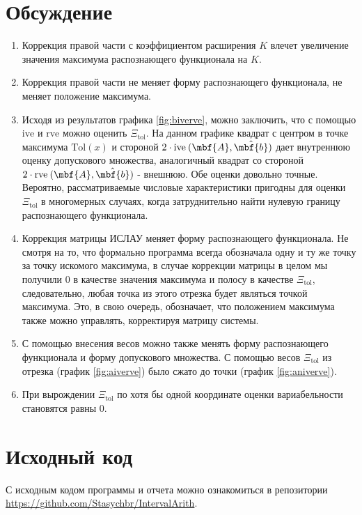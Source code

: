 \documentclass[a4paper]{article}
\begin{document}
\section{Обсуждение}
\begin{enumerate}
    \item Коррекция правой части с коэффициентом расширения $K$ влечет увеличение значения максимума распознающего функционала на $K$.
    \item Коррекция правой части не меняет форму распознающего функционала, не меняет положение максимума.
    \item Исходя из результатов графика \ref{fig:biverve}, можно заключить, что с помощью $\mathrm{ive}$ и $\mathrm{rve}$ можно оценить $\Xi_{\mathrm{tol}}$. На данном графике квадрат с центром в точке максимума $\mathrm{Tol}(x)$ и стороной $2\cdot\mathrm{ive}\:(\mbf{A}, \hat{\mbf{b}})$ дает внутреннюю оценку допускового множества, аналогичный квадрат со стороной $2\cdot\mathrm{rve}\:(\mbf{A}, \hat{\mbf{b}})$ - внешнюю. Обе оценки довольно точные. Вероятно, рассматриваемые числовые характеристики пригодны для оценки $\Xi_{\mathrm{tol}}$ в многомерных случаях, когда затруднительно найти нулевую границу распознающего функционала.
    \item Коррекция матрицы ИСЛАУ меняет форму распознающего функционала. Не смотря на то, что формально программа всегда обозначала одну и ту же точку за точку искомого максимума, в случае коррекции матрицы в целом мы получили 0 в качестве значения максимума и полосу в качестве $\Xi_{\mathrm{tol}}$, следовательно, любая точка из этого отрезка будет являться точкой максимума. Это, в свою очередь, обозначает, что положением максимума также можно управлять, корректируя матрицу системы.
    \item С помощью внесения весов можно также менять форму распознающего функционала и форму допускового множества. С помощью весов $\Xi_{\mathrm{tol}}$ из отрезка (график \ref{fig:aiverve}) было сжато до точки (график \ref{fig:aniverve}).
    \item При вырождении $\Xi_{\mathrm{tol}}$ по хотя бы одной координате оценки вариабельности становятся равны 0.
\end{enumerate}
\section*{Исходный код}
С исходным кодом программы и отчета можно ознакомиться в репозитории \url{https://github.com/Stasychbr/IntervalArith}.
\end{document}
